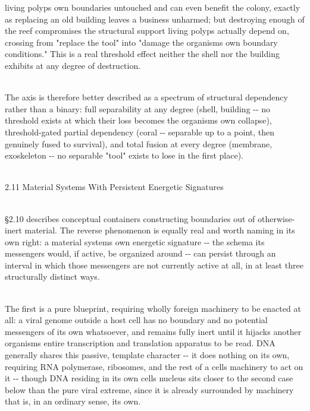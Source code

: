\documentclass[
]{article}
\begin{document}
living polyps\textquotesingle{} own boundaries untouched and can even
benefit the colony, exactly as replacing an old building leaves a
business unharmed; but destroying enough of the reef compromises the
structural support living polyps actually depend on, crossing from
"replace the tool" into "damage the organism\textquotesingle s own
boundary conditions." This is a real threshold effect neither the shell
nor the building exhibits at any degree of destruction.\\
\strut \\
The axis is therefore better described as a spectrum of structural
dependency rather than a binary: full separability at any degree (shell,
building -\/- no threshold exists at which their loss becomes the
organism\textquotesingle s own collapse), threshold-gated partial
dependency (coral -\/- separable up to a point, then genuinely fused to
survival), and total fusion at every degree (membrane, exoskeleton -\/-
no separable "tool" exists to lose in the first place).\\
\strut \\
2.11 Material Systems With Persistent Energetic Signatures\\
\strut \\
§2.10 describes conceptual containers constructing boundaries out of
otherwise-inert material. The reverse phenomenon is equally real and
worth naming in its own right: a material system\textquotesingle s own
energetic signature -\/- the schema its messengers would, if active, be
organized around -\/- can persist through an interval in which those
messengers are not currently active at all, in at least three
structurally distinct ways.\\
\strut \\
The first is a pure blueprint, requiring wholly foreign machinery to be
enacted at all: a viral genome outside a host cell has no boundary and
no potential messengers of its own whatsoever, and remains fully inert
until it hijacks another organism\textquotesingle s entire transcription
and translation apparatus to be read. DNA generally shares this passive,
template character -\/- it does nothing on its own, requiring RNA
polymerase, ribosomes, and the rest of a cell\textquotesingle s
machinery to act on it -\/- though DNA residing in its own
cell\textquotesingle s nucleus sits closer to the second case below than
the pure viral extreme, since it is already surrounded by machinery that
is, in an ordinary sense, its own.\\
\strut \\
\end{document}
